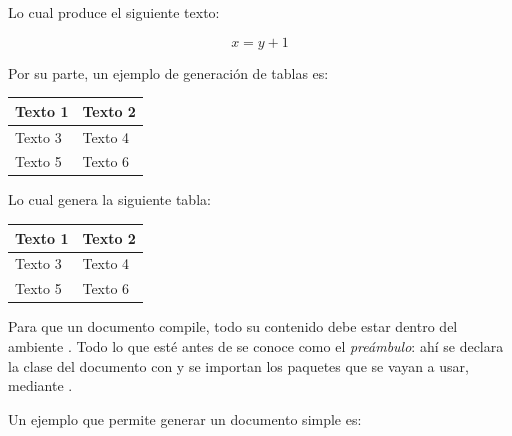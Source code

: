 Lo cual produce el siguiente texto:

\begin{equation}
x=y+1
\end{equation}

Por su parte, un ejemplo de generación de tablas es:

\begin{pseudocode}
\relax\begin{center}
\begin{tabular}{@{}ll@{}}
\toprule
Texto 1 & Texto 2 \\ \midrule
Texto 3 & Texto 4 \\
Texto 5 & Texto 6 \\ \bottomrule
\end{tabular}
\end{center}
\end{pseudocode}

Lo cual genera la siguiente tabla:

\begin{center}
\begin{tabular}{@{}ll@{}}
\toprule
Texto 1 & Texto 2 \\ \midrule
Texto 3 & Texto 4 \\
Texto 5 & Texto 6 \\ \bottomrule
\end{tabular}
\end{center}

Para que un documento compile, todo su contenido debe estar dentro del ambiente . Todo lo que esté antes de  se conoce como el \emph{preámbulo}: ahí se declara la clase del documento con  y se importan los paquetes que se vayan a usar, mediante .

Un ejemplo que permite generar un documento simple es:

